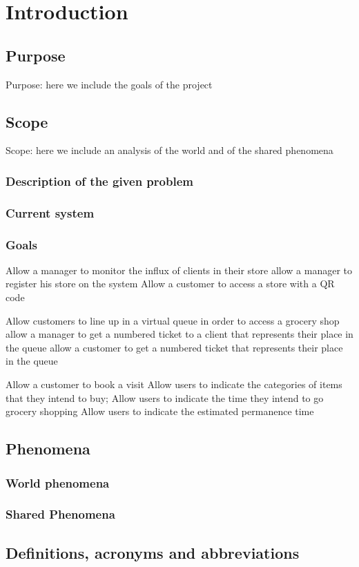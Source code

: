 \section{Introduction}
\label{sect:introduction}
\subsection{Purpose}
Purpose: here we include the goals of the project
\subsection{Scope}
Scope: here we include an analysis of the world and of the shared phenomena
\subsubsection{Description of the given problem}
\subsubsection{Current system}
\subsubsection{Goals}
Allow a manager to monitor the influx of clients in their store 
allow a manager to register his store on the system
Allow a customer to access a store with a QR code

Allow customers to line up in a virtual queue in order to access a grocery shop
allow a manager to get a numbered ticket to a client that represents their place in the queue
allow a customer to get a numbered ticket that represents their place in the queue

Allow a customer to book a visit
Allow users to indicate the categories of items that they intend to buy;
Allow users to indicate the time they intend to go grocery shopping
Allow users to indicate the estimated permanence time 
\subsection{Phenomena}
\subsubsection{World phenomena}
\subsubsection{Shared Phenomena}
\subsection{Definitions, acronyms and abbreviations}
